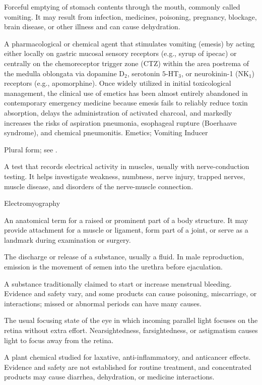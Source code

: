  Forceful emptying of stomach contents through the mouth, commonly called vomiting. It may result from infection, medicines, poisoning, pregnancy, blockage, brain disease, or other illness and can cause dehydration.

 A pharmacological or chemical agent that stimulates vomiting (emesis) by acting either locally on gastric mucosal sensory receptors (e.g., syrup of ipecac) or centrally on the chemoreceptor trigger zone (CTZ) within the area postrema of the medulla oblongata via dopamine $\text{D}_2$, serotonin $5\text{-HT}_3$, or neurokinin-1 ($\text{NK}_1$) receptors (e.g., apomorphine). Once widely utilized in initial toxicological management, the clinical use of emetics has been almost entirely abandoned in contemporary emergency medicine because emesis fails to reliably reduce toxin absorption, delays the administration of activated charcoal, and markedly increases the risks of aspiration pneumonia, esophageal rupture (Boerhaave syndrome), and chemical pneumonitis.
\synonyms
Emetics; Vomiting Inducer

 Plural form; see .

 A test that records electrical activity in muscles, usually with nerve-conduction testing. It helps investigate weakness, numbness, nerve injury, trapped nerves, muscle disease, and disorders of the nerve-muscle connection.

\synonyms
Electromyography

 An anatomical term for a raised or prominent part of a body structure. It may provide attachment for a muscle or ligament, form part of a joint, or serve as a landmark during examination or surgery.

 The discharge or release of a substance, usually a fluid. In male reproduction, emission is the movement of semen into the urethra before ejaculation.

 A substance traditionally claimed to start or increase menstrual bleeding. Evidence and safety vary, and some products can cause poisoning, miscarriage, or interactions; missed or abnormal periods can have many causes.

 The usual focusing state of the eye in which incoming parallel light focuses on the retina without extra effort. Nearsightedness, farsightedness, or astigmatism causes light to focus away from the retina.

 A plant chemical studied for laxative, anti-inflammatory, and anticancer effects. Evidence and safety are not established for routine treatment, and concentrated products may cause diarrhea, dehydration, or medicine interactions.

